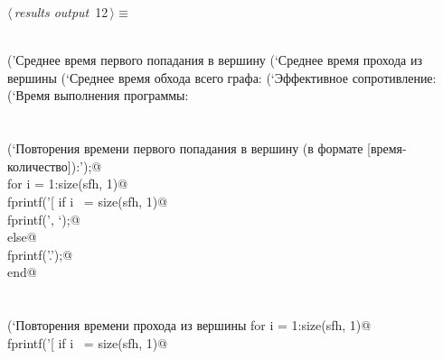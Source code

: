 \documentclass{article}
\begin{document}
\begin{flushleft} \small
\begin{minipage}{\linewidth}\label{scrap17}\raggedright\small
{} $\langle\,${\itshape results output}\nobreak\ {\footnotesize {12}}$\,\rangle\equiv$
\vspace{-1ex}
\begin{list}{}{} \item
\mbox{}\verb@@\\
\mbox{}\verb@fprintf('Среднее время первого попадания в вершину %d из вершины %d: %f шага.\n’, end_, start, mfht);@\\
\mbox{}\verb@fprintf(‘Среднее время прохода из вершины %d в вершину %d и обратно: %f шага.\n’, start, end_, mcmt);@\\
\mbox{}\verb@fprintf(‘Среднее время обхода всего графа: %f шага.\n’, mct);@\\
\mbox{}\verb@fprintf(‘Эффективное сопротивление: %f.\n’, eff_res);@\\
\mbox{}\verb@fprintf(‘Время выполнения программы: %f секунд.\н’, elapsed_time);@\\
\mbox{}\verb@@\\
\mbox{}\verb@@\\
\mbox{}\verb@@\\
\mbox{}\verb@fprintf(‘Повторения времени первого попадания в вершину (в формате [время-количество]):\n’);@\\
\mbox{}\verb@    for i = 1:size(sfh, 1)@\\
\mbox{}\verb@       fprintf(’[%d-%d]’, sfh(i, 1), sfh(i, 2));@\\
\mbox{}\verb@       if i ~= size(sfh, 1)@\\
\mbox{}\verb@           fprintf(’, ‘);@\\
\mbox{}\verb@       else@\\
\mbox{}\verb@           fprintf(’.\n’);@\\
\mbox{}\verb@       end@\\
\mbox{}\verb@end@\\
\mbox{}\verb@@\\
\mbox{}\verb@fprintf(‘Повторения времени прохода из вершины %d в вершину %d и обратно (в формате [время-количество]):\n’, start, end_);@\\
\mbox{}\verb@    for i = 1:size(sfh, 1)@\\
\mbox{}\verb@       fprintf(’[%d-%d]’, scmt(i, 1), scmt(i, 2));@\\
\mbox{}\verb@       if i ~= size(sfh, 1)@\\

\end{list}
\end{minipage}
\end{flushleft}
\end{document}
